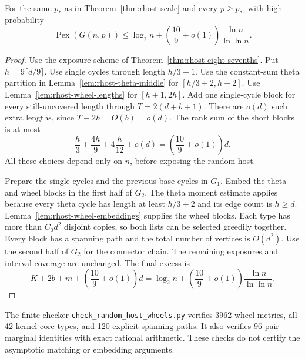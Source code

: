 \begin{theorem}\label{thm:rhost-ten-ninths}
For the same $p_*$ as in Theorem~\ref{thm:rhost-scale} and every $p\ge p_*$,
with high probability
\[
 \operatorname{Pex}(G(n,p))
 \le\log_2n+\left(\frac{10}9+o(1)\right)\frac{\ln n}{\ln\ln n}.
\]
\end{theorem}

\begin{proof}
Use the exposure scheme of Theorem~\ref{thm:rhost-eight-sevenths}.
Put $h=9\lceil d/9\rceil$.
Use single cycles through length $h/3+1$.
Use the constant-sum theta partition in Lemma~\ref{lem:rhost-theta-middle} for $[h/3+2,h-2]$.
Use Lemma~\ref{lem:rhost-wheel-lengths} for $[h+1,2h]$.
Add one single-cycle block for every still-uncovered length through $T=2(d+b+1)$.
There are $o(d)$ such extra lengths, since $T-2h=O(b)=o(d)$.
The rank sum of the short blocks is at most
\[
 \frac h3+\frac{4h}9+4\frac h{12}+o(d)
 =\left(\frac{10}9+o(1)\right)d.
\]
All these choices depend only on $n$, before exposing the random host.

Prepare the single cycles and the previous base cycles in $G_1$.
Embed the theta and wheel blocks in the first half of $G_2$.
The theta moment estimate applies because every theta cycle has length at least $h/3+2$ and its edge count is $h\ge d$.
Lemma~\ref{lem:rhost-wheel-embeddings} supplies the wheel blocks.
Each type has more than $C_0d^2$ disjoint copies, so both lists can be selected greedily together.
Every block has a spanning path and the total number of vertices is $O(d^2)$.
Use the second half of $G_2$ for the connector chain.
The remaining exposures and interval coverage are unchanged.
The final excess is
\[
 K+2b+m+\left(\frac{10}9+o(1)\right)d
 =\log_2n+\left(\frac{10}9+o(1)\right)\frac{\ln n}{\ln\ln n}.
\]
\end{proof}

The finite checker \texttt{check\_random\_host\_wheels.py} verifies 3962 wheel metrics, all 42 kernel core types, and 120 explicit spanning paths.
It also verifies 96 pair-marginal identities with exact rational arithmetic.
These checks do not certify the asymptotic matching or embedding arguments.
